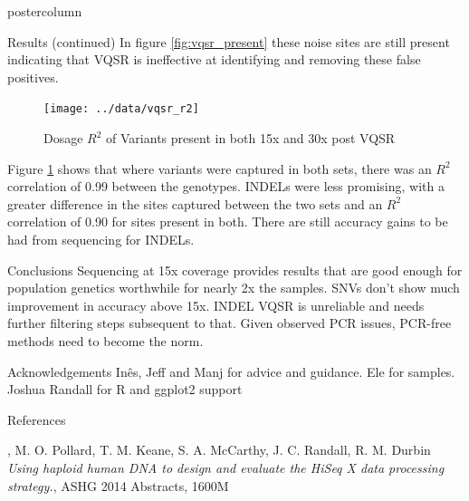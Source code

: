 \documentclass[final,xcolor=table]{beamer}
\begin{document}
\begin{frame}{}
\begin{columns}[t]
\begin{column}{.49\textwidth}
\begin{beamercolorbox}[center,wd=\textwidth]{postercolumn}
\begin{minipage}[T]{.95\textwidth}
\begin{block}{Results (continued)}
                {In figure \ref{fig:vqsr_present} these noise sites are still present indicating that VQSR is ineffective at identifying and removing these false positives.}

                \begin{figure}
                \texttt{[image: ../data/vqsr\_r2]}
                \caption{Dosage $R^2$ of Variants present in both 15x and 30x post VQSR}
                \label{fig:r2}
                \end{figure}

                Figure \ref{fig:r2} shows that where variants were captured in both sets, there was an $R^2$ correlation of 0.99 between the genotypes. INDELs were less promising, with a greater difference in the sites captured between the two sets and an $R^2$ correlation of 0.90 for sites present in both. There are still accuracy gains to be had from sequencing for INDELs.

            \end{block}
            \begin{block}{Conclusions}
                Sequencing at 15x coverage provides results that are good enough for population genetics worthwhile for nearly 2x the samples. SNVs don't show much improvement in accuracy above 15x. INDEL VQSR is unreliable and needs further filtering steps subsequent to that. Given observed PCR issues, PCR-free methods need to become the norm.
            \end{block}
            \begin{block}{Acknowledgements}
                Inês, Jeff and Manj for advice and guidance. Ele for samples. Joshua Randall for R and ggplot2 support
            \end{block}
            \begin{block}{References}
\begin{thebibliography}{1}

,
M. O. Pollard, T. M. Keane, S. A. McCarthy, J. C. Randall, R. M. Durbin
\emph{Using haploid human DNA to design and evaluate the HiSeq X data processing strategy.},
ASHG 2014 Abstracts,
1600M
\end{thebibliography}

            \end{block}
            \vfill


            \end{minipage}
        \end{beamercolorbox}
    \end{column}
    \end{columns}

\end{frame}
\end{document}

